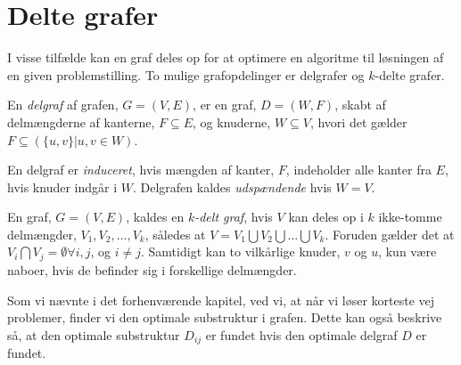 \section{Delte grafer}
I visse tilfælde kan en graf deles op for at optimere en algoritme til løsningen af en given problemstilling.
To mulige grafopdelinger er delgrafer og $k$-delte grafer.

\begin{defn}[Delgraf] \label{defn:delgraf} %
En \emph{delgraf} af grafen, $G= (V,E)$, er en graf, $D = (W,F)$, skabt af delmængderne af kanterne, $F \subseteq E$, og knuderne, $W \subseteq V$, hvori det gælder $F \subseteq (\{u,v\} | u,v \in W)$.
\end{defn}

En delgraf er \emph{induceret}, hvis mængden af kanter, $F$, indeholder alle kanter fra $E$, hvis knuder indgår i $W$.
Delgrafen kaldes \emph{udspændende} hvis $W=V$. 

\begin{defn} \label{defn:k-delt} %
En graf, $G = (V, E)$, kaldes en \emph{$k$-delt graf}, hvis $V$ kan deles op i $k$ ikke-tomme delmængder, $V_1, V_2,\dotsc, V_k$, således at $V= V_1 \bigcup V_2 \bigcup \dotsc \bigcup V_k$. Foruden gælder det at $V_i \bigcap V_j  = \emptyset \forall i,j$, og $i\neq j$. Samtidigt kan to vilkårlige knuder, $v$ og $u$, kun være naboer, hvis de befinder sig i forskellige delmængder. 
\end{defn}

Som vi nævnte i det forhenværende kapitel, ved vi, at når vi løser korteste vej problemer, finder vi den optimale substruktur i grafen. Dette kan også beskrive så, at den optimale substruktur $D_{ij}$ er fundet hvis den optimale delgraf $D$ er fundet.



